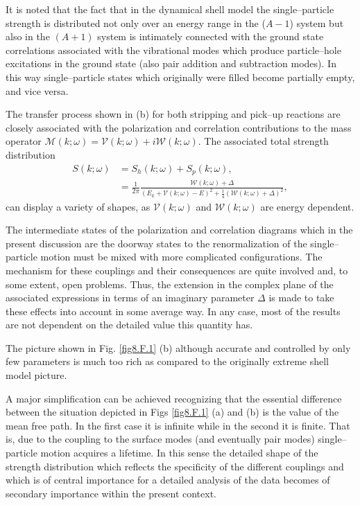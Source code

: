 \begin{subappendices}
It is noted that the fact that in the dynamical shell model the single--particle strength is distributed not only over an energy range in the ($A-1$) system but also in the $(A+1)$ system is intimately connected with the ground state correlations associated with the vibrational modes which produce particle--hole excitations in the ground state (also pair addition and subtraction modes). In this way single--particle states which originally were filled become partially empty, and vice versa.


The transfer process shown in (b) for both stripping and pick--up reactions are closely associated with the polarization and correlation contributions to the mass operator $\mathcal M(k;\omega)=\mathcal V(k;\omega)+i\mathcal W(k;\omega)$. The associated total strength distribution
 \begin{align*}
 S(k;\omega)&=S_h(k;\omega)+S_p(k;\omega),\\
 &=\frac{1}{2\pi}\frac{\mathcal W(k;\omega)+\Delta}{(E_k+\mathcal V(k;\omega)-E)^2+\frac{1}{4}\left(\mathcal W(k;\omega)+\Delta\right)^2},
 \end{align*}
can display a variety of shapes, as $\mathcal V(k;\omega)$ and $\mathcal W(k;\omega)$ are energy dependent.


The intermediate states of the polarization and correlation diagrams which in the present discussion are the doorway states to the renormalization of the single--particle motion must be mixed with more complicated configurations. The mechanism for these couplings and their consequences are quite involved and, to some extent, open problems. Thus, the extension in the complex plane of the associated expressions in terms of an imaginary parameter $\Delta$ is made to take these effects into account in some average way. In any case, most of the results are not dependent on the detailed value this quantity has. 


The picture shown in Fig. \ref{fig8.F.1} (b) although accurate and controlled by only few parameters is much too rich as compared to the originally extreme shell model picture.


A major simplification can be achieved recognizing that the essential difference between the situation depicted in Figs \ref{fig8.F.1} (a) and (b) is the value of the mean free path. In the first case it is infinite while in the second it is finite. That is, due to the coupling to the surface modes (and eventually pair modes) single--particle motion acquires a lifetime. In this sense the detailed shape of the strength distribution which reflects the specificity of the different couplings and which is of central importance for a detailed analysis of the data becomes of secondary importance within the present context.



\end{subappendices}
